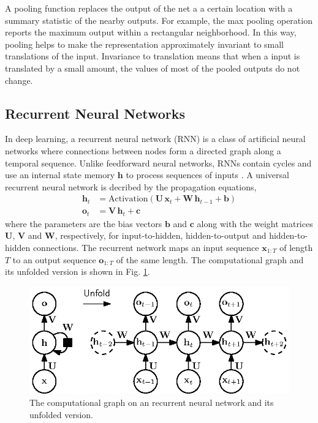 \documentclass{scrartcl}
\begin{document}
A pooling function replaces the output of the net a a certain location with a summary statistic of the nearby outputs. For example, the max pooling \cite{Zhou1988} operation reports the maximum output within a rectangular neighborhood. In this way, pooling helps to make the representation approximately invariant to small translations of the input. Invariance to translation means that when a input is translated by a small amount, the values of most of the pooled outputs do not change.




\subsection{Recurrent Neural Networks}

In deep learning, a recurrent neural network (RNN) \cite{Rumelhart1988} is a class of artificial neural networks where connections between nodes form a directed graph along a temporal sequence. Unlike feedforward neural networks, RNNs contain cycles and use an internal state memory $\mathbf h$ to process sequences of inputs \cite{Elman1990}. A universal recurrent neural network is decribed by the propagation equations,
\begin{align}
\mathbf h_t &= \text{Activation}(\mathbf U \,\mathbf x_t + \mathbf W \, \mathbf h_{t-1} + \mathbf b) \\
\mathbf o_t &= \mathbf V \, \mathbf h_t + \mathbf c 
\end{align} 
where the parameters are the bias vectors $\mathbf b$ and $\mathbf c$ along with the weight matrices $\mathbf U$, $\mathbf V$ and $\mathbf W$, respectively, for input-to-hidden, hidden-to-output and hidden-to-hidden connections. The recurrent network maps an input sequence $\mathbf x_{1:T}$ of length $T$ to an output sequence $\mathbf o_{1:T}$ of the same length. The computational graph and its unfolded version is shown in Fig. \ref{fig:rnn}.
\begin{figure}[htbp]
\centering
\includegraphics[scale=1]{figures/rnn.eps}
\caption{The computational graph on an recurrent neural network and its unfolded version.}
\label{fig:rnn}
\end{figure}    
\end{document}
